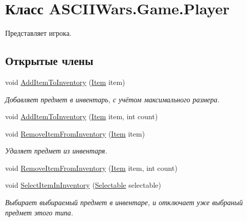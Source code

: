 \hypertarget{class_a_s_c_i_i_wars_1_1_game_1_1_player}{}\section{Класс A\+S\+C\+I\+I\+Wars.\+Game.\+Player}
\label{class_a_s_c_i_i_wars_1_1_game_1_1_player}


Представляет игрока.  


\subsection*{Открытые члены}
\begin{DoxyCompactItemize}
\item 
void \hyperlink{class_a_s_c_i_i_wars_1_1_game_1_1_player_a51054cd802e781a9f0a018f893ec3877}{Add\+Item\+To\+Inventory} (\hyperlink{class_a_s_c_i_i_wars_1_1_game_1_1_item}{Item} item)
\begin{DoxyCompactList}\small\item\em Добавляет предмет в инвентарь, с учётом максимального размера. \end{DoxyCompactList}\item 
void \hyperlink{class_a_s_c_i_i_wars_1_1_game_1_1_player_a7c362d28cd4146ebdcebc754982c0ad8}{Add\+Item\+To\+Inventory} (\hyperlink{class_a_s_c_i_i_wars_1_1_game_1_1_item}{Item} item, int count)
\item 
void \hyperlink{class_a_s_c_i_i_wars_1_1_game_1_1_player_aa58a605f6337c385f4023ea842f6c246}{Remove\+Item\+From\+Inventory} (\hyperlink{class_a_s_c_i_i_wars_1_1_game_1_1_item}{Item} item)
\begin{DoxyCompactList}\small\item\em Удаляет предмет из инвентаря. \end{DoxyCompactList}\item 
void \hyperlink{class_a_s_c_i_i_wars_1_1_game_1_1_player_acef087ca862c4f210d7d049a2b09b29f}{Remove\+Item\+From\+Inventory} (\hyperlink{class_a_s_c_i_i_wars_1_1_game_1_1_item}{Item} item, int count)
\item 
void \hyperlink{class_a_s_c_i_i_wars_1_1_game_1_1_player_aec1c1f808fa3da1585a62487b0e92a38}{Select\+Item\+In\+Inventory} (\hyperlink{class_a_s_c_i_i_wars_1_1_game_1_1_selectable}{Selectable} selectable)
\begin{DoxyCompactList}\small\item\em Выбирает выбираемый предмет в инвентаре, и отключает уже выбраный предмет этого типа. \end{DoxyCompactList}\item 

\end{DoxyCompactItemize}
